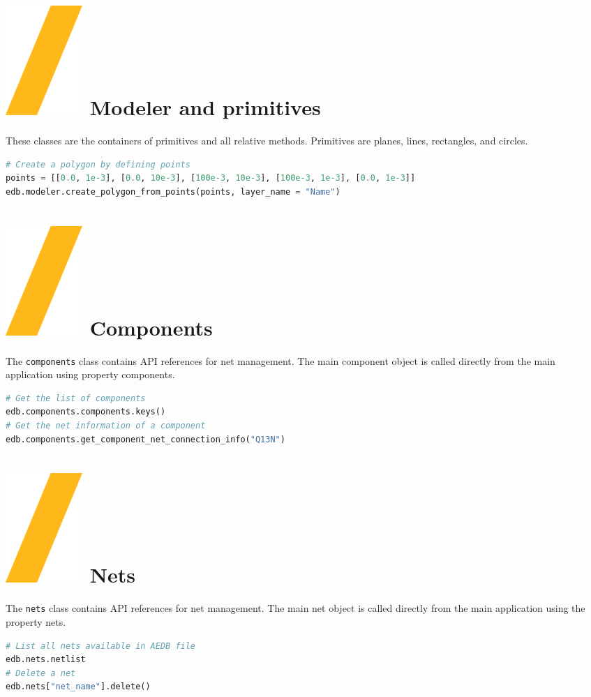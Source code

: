 \documentclass[landscape]{article}
\begin{document}
\begin{multicols}{3}
\section{\includegraphics[height=\fontcharht\font`\S]{slash.png} Modeler and primitives}
These classes are the containers of primitives and all relative methods. Primitives are planes, lines, rectangles, and circles.
\begin{lstlisting}[language=Python]
# Create a polygon by defining points
points = [[0.0, 1e-3], [0.0, 10e-3], [100e-3, 10e-3], [100e-3, 1e-3], [0.0, 1e-3]]
edb.modeler.create_polygon_from_points(points, layer_name = "Name")
\end{lstlisting}
\section{\includegraphics[height=\fontcharht\font`\S]{slash.png} Components}
The \texttt{components} class contains API references for net management. The main component object is called directly from the main application using property components.
\begin{lstlisting}[language=Python]
# Get the list of components
edb.components.components.keys()
# Get the net information of a component
edb.components.get_component_net_connection_info("Q13N")
\end{lstlisting}
\section{\includegraphics[height=\fontcharht\font`\S]{slash.png} Nets}
The \texttt{nets} class contains API references for net management. The main net object is called directly from the main application using the property nets.
\begin{lstlisting}[language=Python]
# List all nets available in AEDB file
edb.nets.netlist
# Delete a net
edb.nets["net_name"].delete()
\end{lstlisting}

\end{multicols}
\end{document}
